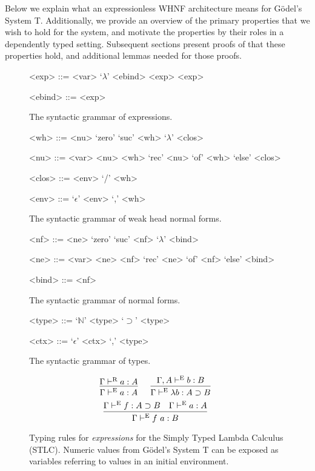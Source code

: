 \documentclass[preprint,authoryear]{sigplanconf}
\def\turnstyle{\vdash}
\def\asc{:}
\def\arr{\supset}
\def\nat{\mathbb{N}}
\def\emp{\epsilon}
\newcommand{\con}[1]{\textmd{#1}}
\newcommand{\turn}[1]{\turnstyle^\con{#1}}
\newcommand{\typr}[2]{\Gamma \turn{R}  #1 \asc #2}
\newcommand{\type}[2]{\ctype{\Gamma}{#1}{#2}}
\newcommand{\ctype}[3]{#1 \turn{E}  #2 \asc #3}
\begin{document}
Below we explain what an expressionless WHNF
architecture means for G{\"o}del's System T.
Additionally, we provide an overview of the primary properties that we
wish to hold for the system, and motivate the properties by their roles in a
dependently typed setting. Subsequent sections present proofs of
that these properties hold, and additional lemmas needed for those
proofs.

\begin{figure}[t!]
\caption{
The syntactic grammar of expressions.
}
\begin{grammar}
<exp> ::= <var> 
\alt `\(\lambda\)' <ebind>
\alt <exp> <exp>

<ebind> ::= <exp> 
\end{grammar}
\label{fig:gram:exp}
\end{figure}

\begin{figure}[t!]
\caption{
The syntactic grammar of weak head normal forms.
}
\begin{grammar}
<wh> ::= <nu> 
\alt `zero'
\alt `suc' <wh>
\alt `\(\lambda\)' <clos>

<nu> ::= <var> 
\alt <nu> <wh>
\alt `rec' <nu> `of' <wh> `else' <clos>

<clos> ::= <env> `/' <wh>

<env> ::= `\(\emp\)'
\alt <env> `,' <wh>
\end{grammar}
\label{fig:gram:wh}
\end{figure}

\begin{figure}[t!]
\caption{
The syntactic grammar of normal forms.
}
\begin{grammar}
<nf> ::= <ne> 
\alt `zero'
\alt `suc' <nf>
\alt `\(\lambda\)' <bind>

<ne> ::= <var> 
\alt <ne> <nf>
\alt `rec' <ne> `of' <nf> `else' <bind>

<bind> ::= <nf> 
\end{grammar}
\label{fig:gram:nf}
\end{figure}

\begin{figure}[t!]
\caption{
The syntactic grammar of types.
}
\begin{grammar}
<type> ::= `\(\nat\)'
\alt <type> `\(\arr\)' <type>

<ctx> ::= `\(\emp\)'
\alt <ctx> `,' <type>
\end{grammar}
\label{fig:gram:type}
\end{figure}

\begin{figure}[t!]
\caption{
Typing rules for \textit{expressions} for the Simply Typed Lambda
Calculus (STLC). Numeric values from G{\"o}del's System T can be
exposed as variables referring to values in an initial environment.
}
$$
\infer
  []
  {\type{a}{A}}
{
  \typr{a}{A}
}
\quad
\infer
  []
  {\type{\lambda b}{A \arr B}}
{
  \ctype{\Gamma, A}{b}{B}
}
$$
$$
\infer
  []
  {\type{f~a}{B}}
{
  \type{f}{A \arr B}
  &
  \type{a}{A}
}
$$
\label{fig:type:exp}
\end{figure}
\end{document}
